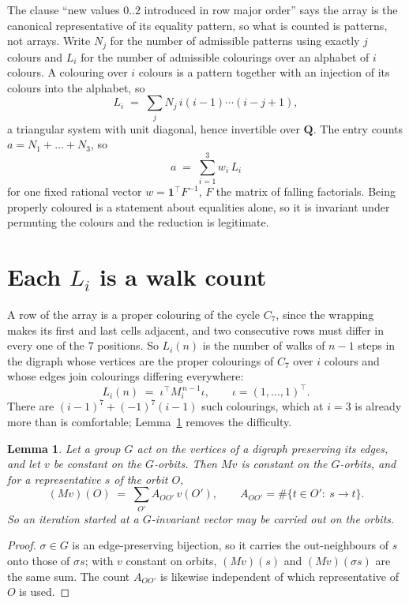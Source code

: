 \documentclass[11pt,a4paper]{article}
\theoremstyle{plain}
\newtheorem{lemma}[theorem]{Lemma}
\theoremstyle{definition}
\begin{document}
The clause ``new values $0..2$ introduced in row major order'' says the array is the
canonical representative of its equality pattern, so what is counted is patterns, not arrays.
Write $N_j$ for the number of admissible patterns using exactly $j$ colours and $L_i$ for the
number of admissible colourings over an alphabet of $i$ colours. A colouring over $i$ colours
is a pattern together with an injection of its colours into the alphabet, so
\[
L_i\;=\;\sum_j N_j\,i(i-1)\cdots(i-j+1),
\]
a triangular system with unit diagonal, hence invertible over $\mathbf{Q}$. The entry counts
$a=N_1+\dots+N_{3}$, so
\[
a\;=\;\sum_{i=1}^{3}w_i\,L_i
\]
for one fixed rational vector $w=\mathbf{1}^{\!\top}F^{-1}$, $F$ the matrix of falling
factorials. Being properly coloured is a statement about equalities alone, so it is invariant
under permuting the colours and the reduction is legitimate.

\section{Each $L_i$ is a walk count}

A row of the array is a proper colouring of the cycle $C_{7}$, since the wrapping makes
its first and last cells adjacent, and two consecutive rows must differ in every one of the
$7$ positions. So $L_i(n)$ is the number of walks of $n-1$ steps in the digraph whose
vertices are the proper colourings of $C_{7}$ over $i$ colours and whose edges join
colourings differing everywhere:
\[
L_i(n)\;=\;\iota^{\!\top}M_i^{\,n-1}\iota ,\qquad \iota=(1,\dots,1)^{\!\top} .
\]
There are $(i-1)^{7}+(-1)^{7}(i-1)$ such colourings, which at $i=3$ is already more
than is comfortable; Lemma~\ref{lem:lump} removes the difficulty.

\begin{lemma}\label{lem:lump}
Let a group $G$ act on the vertices of a digraph preserving its edges, and let $v$ be constant
on the $G$-orbits. Then $Mv$ is constant on the $G$-orbits, and for a representative $s$ of
the orbit $O$,
\[
(Mv)(O)\;=\;\sum_{O'}A_{OO'}\,v(O'),\qquad
A_{OO'}=\#\{t\in O':\ s\to t\} .
\]
So an iteration started at a $G$-invariant vector may be carried out on the orbits.
\end{lemma}

\begin{proof}
$\sigma\in G$ is an edge-preserving bijection, so it carries the out-neighbours of $s$ onto
those of $\sigma s$; with $v$ constant on orbits, $(Mv)(s)$ and $(Mv)(\sigma s)$ are the same
sum. The count $A_{OO'}$ is likewise independent of which representative of $O$ is used.
\end{proof}
\end{document}
